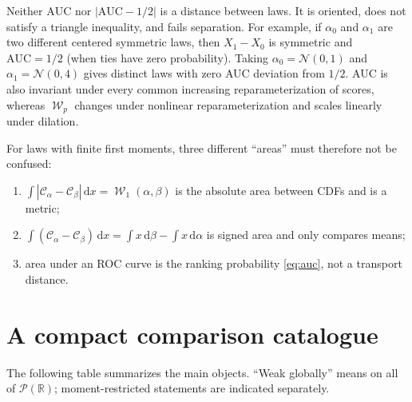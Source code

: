 \documentclass[11pt]{article}
\newcommand{\RR}{\mathbb R}
\newcommand{\Pp}{\mathcal P}
\newcommand{\Nn}{\mathcal N}
\renewcommand{\d}{\,\mathrm d}
\newcommand{\al}{\alpha}
\newcommand{\be}{\beta}
\newcommand{\Cc}{\mathcal C}
\newcommand{\cumul}[1]{\Cc_{#1}}
\DeclareMathOperator{\Wass}{\mathcal W}
\newcommand{\AUC}{\mathrm{AUC}}
\begin{document}
Neither $\AUC$ nor $|\AUC-1/2|$ is a distance between laws.  It is oriented,
does not satisfy a triangle inequality, and fails separation.  For example,
if $\al_0$ and $\al_1$ are two different centered symmetric laws, then
$X_1-X_0$ is symmetric and $\AUC=1/2$ (when ties have zero probability).
Taking $\al_0=\Nn(0,1)$ and
$\al_1=\Nn(0,4)$ gives distinct laws with zero AUC deviation from
$1/2$.  AUC is also invariant under every common increasing reparameterization
of scores, whereas $\Wass_p$ changes under nonlinear reparameterization and
scales linearly under dilation.

For laws with finite first moments, three different ``areas'' must therefore
not be confused:
\begin{enumerate}[label=\textnormal{(\roman*)},leftmargin=2.2em]
\item $\int|\cumul{\al}-\cumul{\be}|\d x=\Wass_1(\al,\be)$ is the absolute area
      between CDFs and is a metric;
\item $\int(\cumul{\al}-\cumul{\be})\d x
      =\int x\d\be-\int x\d\al$ is signed area and only compares means;
\item area under an ROC curve is the ranking probability
      \eqref{eq:auc}, not a transport distance.
\end{enumerate}

\section{A compact comparison catalogue}

The following table summarizes the main objects.  ``Weak globally'' means on
all of $\Pp(\RR)$; moment-restricted statements are indicated separately.
\end{document}
